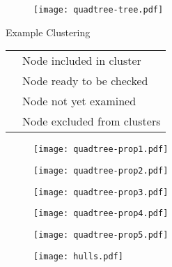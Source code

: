\documentclass{beamer}
\begin{document}
\begin{frame}
	\begin{figure}
		\texttt{[image: quadtree-tree.pdf]}
	\end{figure}
\end{frame}

\begin{frame}{Example Clustering}
	\begin{table}
		\begin{tabular}{l l}
			\cellcolor{lred}   & Node included in cluster \\
			\cellcolor{lblue}  & Node ready to be checked \\
			\phantom{one}      & Node not yet examined \\
			\cellcolor{silver} & Node excluded from clusters \\
		\end{tabular}
	\end{table}
\end{frame}

\begin{frame}
	\begin{figure}
		\texttt{[image: quadtree-prop1.pdf]}
	\end{figure}
\end{frame}

\begin{frame}
	\begin{figure}
		\texttt{[image: quadtree-prop2.pdf]}
	\end{figure}
\end{frame}

\begin{frame}
	\begin{figure}
		\texttt{[image: quadtree-prop3.pdf]}
	\end{figure}
\end{frame}

\begin{frame}
	\begin{figure}
		\texttt{[image: quadtree-prop4.pdf]}
	\end{figure}
\end{frame}

\begin{frame}
	\begin{figure}
		\texttt{[image: quadtree-prop5.pdf]}
	\end{figure}
\end{frame}

\begin{frame}
	\begin{figure}
		\texttt{[image: hulls.pdf]}
	\end{figure}
\end{frame}

\begin{frame}
\end{frame}
\end{document}
